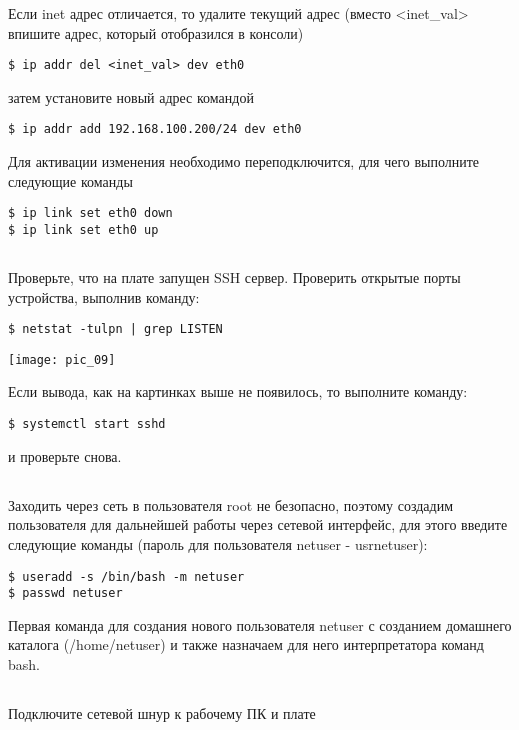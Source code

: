 Если inet адрес отличается, то удалите текущий адрес (вместо <inet\_val> впишите адрес, который отобразился в консоли)
\begin{lstlisting}[style=bash]
$ ip addr del <inet_val> dev eth0
\end{lstlisting}
затем установите новый адрес командой 
\begin{lstlisting}[style=bash]
$ ip addr add 192.168.100.200/24 dev eth0
\end{lstlisting} 
Для активации изменения необходимо переподключится, для чего выполните следующие команды
\begin{lstlisting}[style=bash]
$ ip link set eth0 down
$ ip link set eth0 up
\end{lstlisting} 

\subsection{}Проверьте, что на плате запущен SSH сервер. Проверить открытые порты устройства, выполнив команду: 

\begin{lstlisting}[style=bash]
$ netstat -tulpn | grep LISTEN
\end{lstlisting} 
\begin{center}
	\texttt{[image: pic\_09]}
\end{center}
Если вывода, как на картинках выше не появилось, то выполните команду: 
\begin{lstlisting}[style=bash]
$ systemctl start sshd 
\end{lstlisting}
и проверьте снова. 

\subsection{}\label{lab2:ref1}Заходить через сеть в пользователя root не безопасно, поэтому создадим пользователя для дальнейшей работы через сетевой интерфейс, для этого введите следующие команды (пароль для пользователя netuser - usrnetuser):
\begin{lstlisting}[style=bash]
$ useradd -s /bin/bash -m netuser
$ passwd netuser
\end{lstlisting}

Первая команда для создания нового пользователя netuser с созданием домашнего каталога (/home/netuser) и также назначаем для него интерпретатора команд bash. 

\subsection{}Подключите сетевой шнур к рабочему ПК и плате

